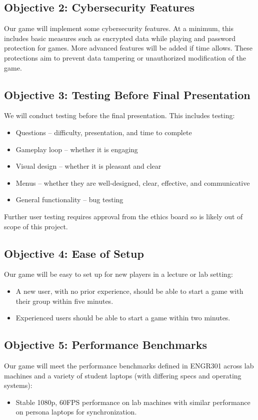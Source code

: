 \documentclass{article}
\begin{document}
\subsection*{Objective 2: Cybersecurity Features}
Our game will implement some cybersecurity features. At a minimum, this includes basic measures such as encrypted data while playing and password protection for games. More advanced features will be added if time allows. These protections aim to prevent data tampering or unauthorized modification of the game.

\subsection*{Objective 3: Testing Before Final Presentation}
We will conduct testing before the final presentation. This includes testing:
\begin{itemize}
    \item Questions – difficulty, presentation, and time to complete
    \item Gameplay loop – whether it is engaging
    \item Visual design – whether it is pleasant and clear
    \item Menus – whether they are well-designed, clear, effective, and communicative
    \item General functionality – bug testing
\end{itemize}
Further user testing requires approval from the ethics board so is likely out of scope of this project. 

\subsection*{Objective 4: Ease of Setup}
Our game will be easy to set up for new players in a lecture or lab setting:
\begin{itemize}
    \item A new user, with no prior experience, should be able to start a game with their group within five minutes.
    \item Experienced users should be able to start a game within two minutes.
\end{itemize}

\subsection*{Objective 5: Performance Benchmarks}
Our game will meet the performance benchmarks defined in ENGR301 across lab machines and a variety of student laptops (with differing specs and operating systems):
\begin{itemize}
    \item Stable 1080p, 60FPS performance on lab machines with similar performance on persona laptops for synchronization.
\end{itemize}
\end{document}
